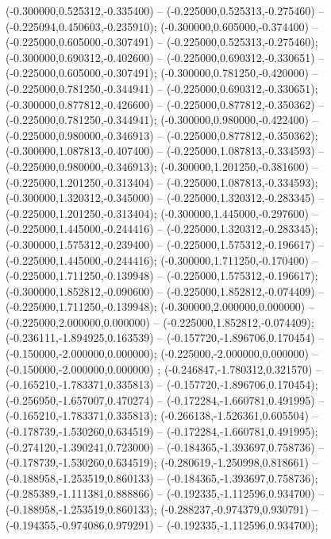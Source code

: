  (-0.300000,0.525312,-0.335400) -- (-0.225000,0.525313,-0.275460) -- (-0.225094,0.450603,-0.235910);
 (-0.300000,0.605000,-0.374400) -- (-0.225000,0.605000,-0.307491) -- (-0.225000,0.525313,-0.275460);
 (-0.300000,0.690312,-0.402600) -- (-0.225000,0.690312,-0.330651) -- (-0.225000,0.605000,-0.307491);
 (-0.300000,0.781250,-0.420000) -- (-0.225000,0.781250,-0.344941) -- (-0.225000,0.690312,-0.330651);
 (-0.300000,0.877812,-0.426600) -- (-0.225000,0.877812,-0.350362) -- (-0.225000,0.781250,-0.344941);
 (-0.300000,0.980000,-0.422400) -- (-0.225000,0.980000,-0.346913) -- (-0.225000,0.877812,-0.350362);
 (-0.300000,1.087813,-0.407400) -- (-0.225000,1.087813,-0.334593) -- (-0.225000,0.980000,-0.346913);
 (-0.300000,1.201250,-0.381600) -- (-0.225000,1.201250,-0.313404) -- (-0.225000,1.087813,-0.334593);
 (-0.300000,1.320312,-0.345000) -- (-0.225000,1.320312,-0.283345) -- (-0.225000,1.201250,-0.313404);
 (-0.300000,1.445000,-0.297600) -- (-0.225000,1.445000,-0.244416) -- (-0.225000,1.320312,-0.283345);
 (-0.300000,1.575312,-0.239400) -- (-0.225000,1.575312,-0.196617) -- (-0.225000,1.445000,-0.244416);
 (-0.300000,1.711250,-0.170400) -- (-0.225000,1.711250,-0.139948) -- (-0.225000,1.575312,-0.196617);
 (-0.300000,1.852812,-0.090600) -- (-0.225000,1.852812,-0.074409) -- (-0.225000,1.711250,-0.139948);
 (-0.300000,2.000000,0.000000) -- (-0.225000,2.000000,0.000000) -- (-0.225000,1.852812,-0.074409);
 (-0.236111,-1.894925,0.163539) -- (-0.157720,-1.896706,0.170454) -- (-0.150000,-2.000000,0.000000);
 (-0.225000,-2.000000,0.000000) -- (-0.150000,-2.000000,0.000000) ;
 (-0.246847,-1.780312,0.321570) -- (-0.165210,-1.783371,0.335813) -- (-0.157720,-1.896706,0.170454);
 (-0.256950,-1.657007,0.470274) -- (-0.172284,-1.660781,0.491995) -- (-0.165210,-1.783371,0.335813);
 (-0.266138,-1.526361,0.605504) -- (-0.178739,-1.530260,0.634519) -- (-0.172284,-1.660781,0.491995);
 (-0.274120,-1.390241,0.723000) -- (-0.184365,-1.393697,0.758736) -- (-0.178739,-1.530260,0.634519);
 (-0.280619,-1.250998,0.818661) -- (-0.188958,-1.253519,0.860133) -- (-0.184365,-1.393697,0.758736);
 (-0.285389,-1.111381,0.888866) -- (-0.192335,-1.112596,0.934700) -- (-0.188958,-1.253519,0.860133);
 (-0.288237,-0.974379,0.930791) -- (-0.194355,-0.974086,0.979291) -- (-0.192335,-1.112596,0.934700);
